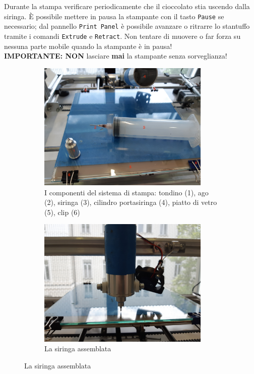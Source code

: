 \documentclass[12pt]{article}
\begin{document}
	Durante la stampa verificare periodicamente che il cioccolato stia uscendo dalla siringa. È possibile mettere in pausa la stampante con il tasto \texttt{Pause} se necessario; dal pannello \texttt{Print Panel} è possibile avanzare o ritrarre lo stantuffo tramite i comandi \texttt{Extrude} e \texttt{Retract}. Non tentare di muovere o far forza su nessuna parte mobile quando la stampante è in pausa!\\
	
	\textbf{IMPORTANTE: NON} lasciare \textbf{mai} la stampante senza sorveglianza!\\
	
	\begin{figure}[H]
        \begin{subfigure}{0.5\textwidth}
                \includegraphics[width=0.9\textwidth]{img/cylinderPieces.jpg}
                \caption*{I componenti del sistema di stampa: tondino (1), ago (2), siringa (3), cilindro portasiringa (4), piatto di vetro (5), clip (6)}
        \end{subfigure}
        \begin{subfigure}{0.5\textwidth}
                \includegraphics[width=0.9\textwidth]{img/cylinderComplete.jpg}
                \caption*{La siringa assemblata}
         \end{subfigure}
	\end{figure}
	
\end{document}
